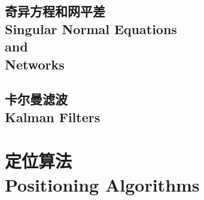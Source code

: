 \documentclass[a4paper,12pt]{book}
\begin{document}
	\chapter[奇异方程和网平差]{奇异方程和网平差\\Singular Normal Equations \\and\\ Networks}
	\minitoc %
	\newpage%
		
		
		
		
		
		
		
		

	\chapter[卡尔曼滤波]{卡尔曼滤波\\Kalman Filters}
	\minitoc %
	\newpage%
		
		
		
		
		
		
		
		
		
		
		
		
		
	
	
\part[定位算法]{定位算法\\Positioning Algorithms}
\end{document}
